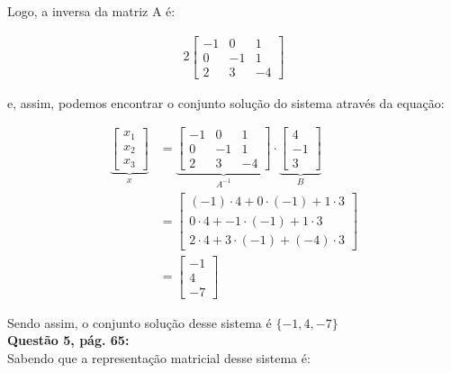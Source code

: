 \documentclass[a4paper,12pt]{article}
\begin{document}
Logo, a inversa da matriz A é:

\begin{alignat*}{2}
    \begin{bmatrix}
        -1 & 0 & 1\\
        0 & -1 & 1\\
        2 & 3 & -4
    \end{bmatrix}
\end{alignat*}  

e, assim, podemos encontrar o conjunto solução do sistema através da equação:

\begin{align*}
    \underbrace{
    \begin{bmatrix}
        x_1\\
        x_2\\
        x_3
    \end{bmatrix}}_{x}
    &=
    \underbrace{
    \begin{bmatrix}
        -1 & 0 & 1\\
        0 & -1 & 1\\
        2 & 3 & -4
    \end{bmatrix}}_{A^{-1}} \cdot
    \underbrace{
    \begin{bmatrix}
        4\\
        -1\\
        3
    \end{bmatrix}}_{B}\\
    &=
    \begin{bmatrix}
        (-1)\cdot4 + 0\cdot(-1) + 1\cdot3\\
        0\cdot4 + -1\cdot(-1) + 1\cdot3\\
        2\cdot4 + 3\cdot(-1) + (-4)\cdot3
    \end{bmatrix}\\
    &=
    \begin{bmatrix}
        -1\\
        4\\
        -7
    \end{bmatrix}
\end{align*}

Sendo assim, o conjunto solução desse sistema é $\{-1, 4, -7\}$\\

\textbf{Questão 5, pág. 65:}\\

Sabendo que a representação matricial desse sistema é:
\end{document}
